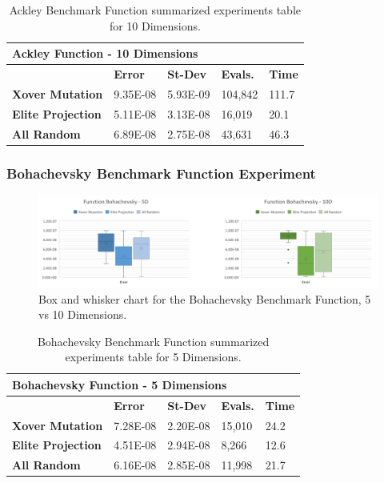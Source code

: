 \documentclass[graybox]{svmult}
\begin{document}
\begin{table}[]
    \scriptsize
    \centering
    \caption{Ackley Benchmark Function summarized experiments table for 10 Dimensions.}\label{tab.fun_ackley10}
    \begin{tabular}{@{}lllll@{}}
    \toprule
    \multicolumn{5}{l}{\textbf{Ackley Function - 10 Dimensions}} \\ \midrule
     & \textbf{Error} & \textbf{St-Dev} & \textbf{Evals.} & \textbf{Time} \\
    \textbf{Xover Mutation} & 9.35E-08 & 5.93E-09 & 104,842 & 111.7 \\
    \textbf{Elite Projection} & 5.11E-08 & 3.13E-08 & 16,019 & 20.1 \\
    \textbf{All Random} & 6.89E-08 & 2.75E-08 & 43,631 & 46.3 \\ \bottomrule
    \end{tabular}
    \end{table}


\subsubsection{Bohachevsky Benchmark Function Experiment}

\begin{figure}
    \includegraphics[width=\textwidth]{img/fig_fun_bohachevsky.pdf}
    \caption{Box and whisker chart for the Bohachevsky Benchmark Function, 5 vs 10 Dimensions.} \label{fig.fun_bohachevsky}
    \end{figure}

\begin{table}[]
    \scriptsize
    \centering
    \caption{Bohachevsky Benchmark Function summarized experiments table for 5 Dimensions.}\label{tab.fun_bohachevsky5}
    \begin{tabular}{@{}lllll@{}}
    \toprule
    \multicolumn{5}{l}{\textbf{Bohachevsky Function - 5 Dimensions}} \\ \midrule
     & \textbf{Error} & \textbf{St-Dev} & \textbf{Evals.} & \textbf{Time} \\
    \textbf{Xover Mutation} & 7.28E-08 & 2.20E-08 & 15,010 & 24.2 \\
    \textbf{Elite Projection} & 4.51E-08 & 2.94E-08 & 8,266 & 12.6 \\
    \textbf{All Random} & 6.16E-08 & 2.85E-08 & 11,998 & 21.7 \\ \bottomrule
    \end{tabular}
    \end{table}
\end{document}
